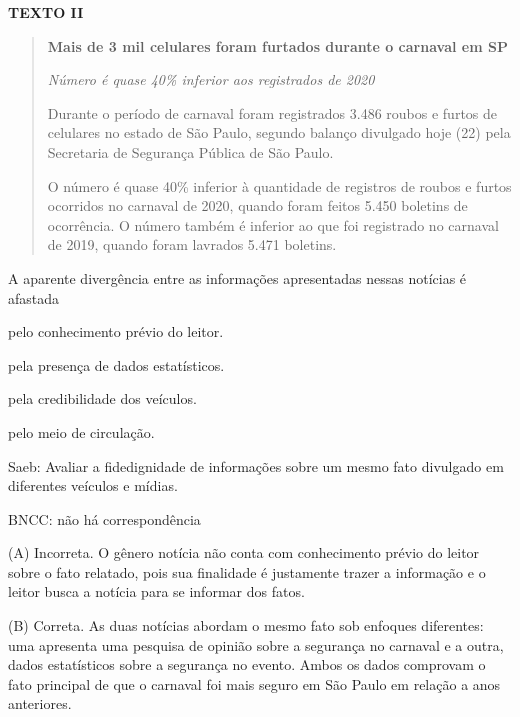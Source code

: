 
\textbf{TEXTO II}

\begin{quote}
\textbf{Mais de 3 mil celulares foram furtados durante o carnaval em SP}

\emph{Número é quase 40\% inferior aos registrados de 2020}

Durante o período de carnaval foram registrados 3.486 roubos e furtos de
celulares no estado de São Paulo, segundo balanço divulgado hoje (22)
pela Secretaria de Segurança Pública de São Paulo.

O número é quase 40\% inferior à quantidade de registros de roubos e
furtos ocorridos no carnaval de 2020, quando foram feitos 5.450 boletins
de ocorrência. O número também é inferior ao que foi registrado no
carnaval de 2019, quando foram lavrados 5.471 boletins.
\end{quote}


A aparente divergência entre as informações apresentadas nessas notícias
é afastada

\begin{escolha}
\item pelo conhecimento prévio do leitor.

\item pela presença de dados estatísticos.

\item pela credibilidade dos veículos.

\item pelo meio de circulação.
\end{escolha}

Saeb: Avaliar a fidedignidade de informações sobre um mesmo fato
divulgado em diferentes veículos e mídias.

BNCC: não há correspondência

(A) Incorreta. O gênero notícia não conta com conhecimento prévio do
leitor sobre o fato relatado, pois sua finalidade é justamente trazer a
informação e o leitor busca a notícia para se informar dos fatos.

(B) Correta. As duas notícias abordam o mesmo fato sob enfoques
diferentes: uma apresenta uma pesquisa de opinião sobre a segurança no
carnaval e a outra, dados estatísticos sobre a segurança no evento.
Ambos os dados comprovam o fato principal de que o carnaval foi mais
seguro em São Paulo em relação a anos anteriores.

